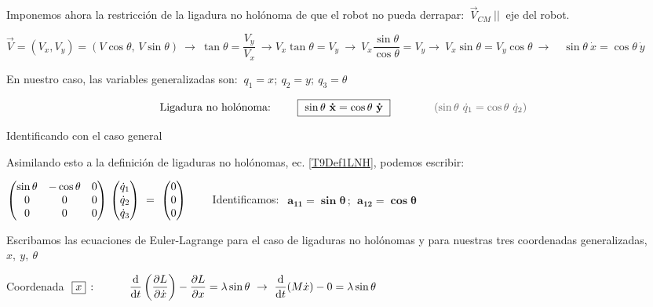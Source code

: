 \begin{example}
\vspace{5mm}Imponemos ahora la restricción de la ligadura no holónoma de que el robot no pueda derrapar: $\ \overrightarrow V_{CM} \ || \ $ eje del robot.

\vspace{2mm}$\overrightarrow V=(V_x,V_y)=(V\cos \theta,\, V\sin \theta) \ \to \ \tan \theta=\dfrac {V_y} {V_x} \ \to V_x \tan \theta = V_y \ \to \ V_x \dfrac{\sin \theta}{\cos \theta}=V_y  \to \ V_x\sin \theta  = V_y \cos \theta \ \to \quad  \sin \theta \ \dot x = \cos 	\theta \ \dot y$

\vspace{2mm} En nuestro caso, las variables generalizadas son: $\ q_1=x;\ q_2=y;\ q_3=\theta$

\vspace{2mm}
\begin{equation}
\label{T9EjLNH}
\text{Ligadura no holónoma: } \qquad \boxed{\bold{ \ \sin \theta \ \dot x = \cos 	\theta \ \dot y \ }}
\qquad \qquad \textcolor{gris}{(\sin \theta \ \dot q_1 = \cos 	\theta \ \dot q_2)}
\end{equation}

\vspace{2mm} Identificando con el caso general


\vspace{2mm}
Asimilando esto a la definición de ligaduras no holónomas, ec. \ref{T9Def1LNH}, podemos escribir:

\vspace{2mm} 
$\mqty(\sin \theta & -\cos \theta & 0 \\ 0&0&0 \\ 0&0&0  ) \ \mqty(\dot q_1 \\ \dot q_2 \\ \dot q_3) \ = \ \mqty(0\\0\\0) \qquad $
Identificamos: $\ \  \boldsymbol{a_{11}=\sin \theta\,;\ \ a_{12}=\cos \theta}$

\vspace{2mm} Escribamos las ecuaciones de Euler-Lagrange para el caso de ligaduras no holónomas y para nuestras tres coordenadas generalizadas, $x,\ y,\ \theta$

\vspace{5mm}

Coordenada $\ \boxed{  x  }\,: \quad  \qquad  \displaystyle \dv{t} \left( \pdv{L}{\dot x} \right) - \pdv{L}{x} = \lambda \sin \theta \ \to \ \dv{t} (M\dot x) - 0 = \lambda \sin \theta$


\end{example}
